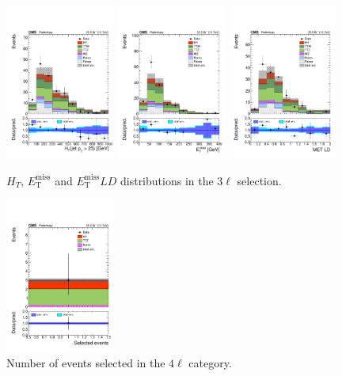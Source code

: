 \begin{figure}[htb]
	\centering 
\includegraphics[width=0.32\textwidth]{plots_leptons/lep_evtsel/3l_SR/htJet25j.pdf}
\includegraphics[width=0.32\textwidth]{plots_leptons/lep_evtsel/3l_SR/met.pdf}
\includegraphics[width=0.32\textwidth]{plots_leptons/lep_evtsel/3l_SR/metLD.pdf}
	\caption{$H_T$, $E_\mathrm{T}^\mathrm{miss}$ and $E_\mathrm{T}^\mathrm{miss}LD$ distributions in the 3$\ell$ selection.}
	\label{fig:3l_ht}
\end{figure}

\begin{figure}[htb]
	\centering 
\includegraphics[width=0.32\textwidth]{plots_leptons/lep_evtsel/4l_SR/tot_weight.pdf}
	\caption{Number of events selected in the $4\ell$ category.}
	\label{fig:4l_numevt}
\end{figure}

\clearpage
